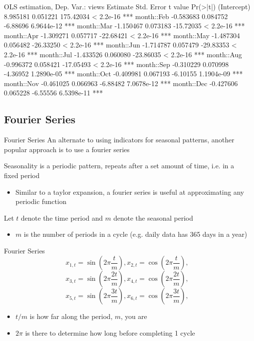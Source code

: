 \documentclass[aspectratio=169,t,11pt,table]{beamer}
\begin{document}
\begin{frame}[fragile]{}
  \begin{codeblock}[{}]
OLS estimation, Dep. Var.: views 
             Estimate Std. Error   t value   Pr(>|t|)    
(Intercept)  8.985181   0.051221 175.42034  < 2.2e-16 ***
month::Feb  -0.583683   0.084752  -6.88696 6.9644e-12 ***
month::Mar  -1.150467   0.073183 -15.72035  < 2.2e-16 ***
month::Apr  -1.309271   0.057717 -22.68421  < 2.2e-16 ***
month::May  -1.487304   0.056482 -26.33250  < 2.2e-16 ***
month::Jun  -1.714787   0.057479 -29.83353  < 2.2e-16 ***
month::Jul  -1.433526   0.060080 -23.86035  < 2.2e-16 ***
month::Aug  -0.996372   0.058421 -17.05493  < 2.2e-16 ***
month::Sep  -0.310229   0.070998  -4.36952 1.2890e-05 ***
month::Oct  -0.409981   0.067193  -6.10155 1.1904e-09 ***
month::Nov  -0.461025   0.066963  -6.88482 7.0678e-12 ***
month::Dec  -0.427606   0.065228  -6.55556 6.5398e-11 ***
  \end{codeblock}
\end{frame}

\subsection{Fourier Series}

\begin{frame}{Fourier Series}
  An alternate to using indicators for seasonal patterns, another popular approach is to use a \alert{fourier series}

  \bigskip
  Seasonality is a \alert{periodic pattern}, repeats after a set amount of time, i.e. in a fixed \alert{period}
  \begin{itemize}
    \item Similar to a taylor expansion, a fourier series is useful at approximating any periodic function
  \end{itemize} 

  \pause
  \bigskip
  Let $t$ denote the time period and $m$ denote the seasonal period
  \begin{itemize}
    \item $m$ is the number of periods in a cycle (e.g. daily data has 365 days in a year)
  \end{itemize}
\end{frame}

\begin{frame}{Fourier Series}
  $$
    x_{1,t} = \sin\left(2\pi \frac{t}{m}\right),
    x_{2,t} = \cos\left(2\pi \frac{t}{m}\right),
  $$
  $$
    x_{3,t} = \sin\left(2\pi \frac{2t}{m}\right),
    x_{4,t} = \cos\left(2\pi \frac{2t}{m}\right),
  $$
  $$
    x_{5,t} = \sin\left(2\pi \frac{3t}{m}\right),
    x_{6,t} = \cos\left(2\pi \frac{3t}{m}\right),
  $$
  
  \bigskip
  \begin{itemize}
    \item $t / m$ is how far along the period, $m$, you are
    
    \item $2 \pi$ is there to determine how long before completing 1 cycle
  \end{itemize}
\end{frame}
\end{document}
